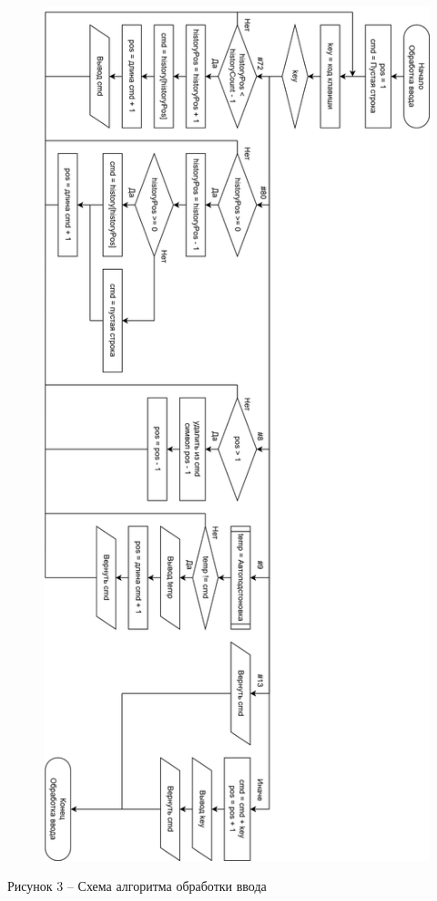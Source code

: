 \documentclass[a4paper,14pt]{extarticle}
\begin{document}
  \pagebreak

  \begin{figure}[h]
    \centering
    \includegraphics[width=0.535\linewidth]{images/s-3}
  \end{figure}
  \begin{center}
    Рисунок 3 – Схема алгоритма обработки ввода
  \end{center}

  \pagebreak
\end{document}
